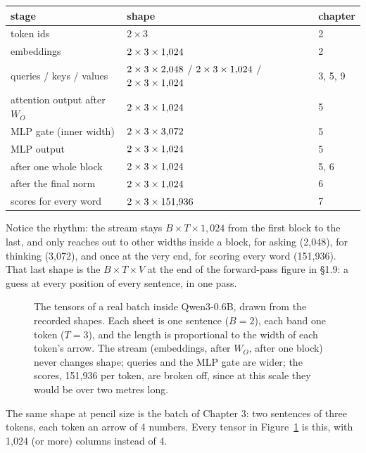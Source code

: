 \begin{center}
\small
\begin{tabular}{@{}l l l@{}}
\toprule
stage & shape & chapter\\
\midrule
token ids & $2\times3$ & 2\\
embeddings & $2\times3\times1{,}024$ & 2\\
queries / keys / values & $2\times3\times2{,}048$ / $2\times3\times1{,}024$ / $2\times3\times1{,}024$ & 3, 5, 9\\
attention output after $W_O$ & $2\times3\times1{,}024$ & 5\\
MLP gate (inner width) & $2\times3\times3{,}072$ & 5\\
MLP output & $2\times3\times1{,}024$ & 5\\
after one whole block & $2\times3\times1{,}024$ & 5, 6\\
after the final norm & $2\times3\times1{,}024$ & 6\\
scores for every word & $2\times3\times151{,}936$ & 7\\
\bottomrule
\end{tabular}
\end{center}

Notice the rhythm: the stream stays $B\times T\times1{,}024$ from the first block to the last, and only reaches out
to other widths inside a block, for asking (2{,}048), for thinking (3{,}072), and once at the very end, for scoring
every word (151{,}936). That last shape is the $B\times T\times V$ at the end of the forward-pass figure in \S1.9: a guess at every position of every
sentence, in one pass.

\begin{figure}[!htb]
\centering

\caption{The tensors of a real batch inside Qwen3-0.6B, drawn from the recorded shapes. Each sheet is one
sentence ($B=2$), each band one token ($T=3$), and the length is proportional to the width of each token's arrow. The stream (embeddings, after $W_O$, after one block) never changes shape; queries and the MLP
gate are wider; the scores, 151{,}936 per token, are broken off, since at this scale they would be over two
metres long.}
\label{fig:ch10tensors}
\end{figure}

The same shape at pencil size is the batch of Chapter 3: two sentences of three tokens, each token an arrow of
4 numbers. Every tensor in Figure~\ref{fig:ch10tensors} is this, with 1{,}024 (or more) columns instead of 4.

\begin{center}

\end{center}

